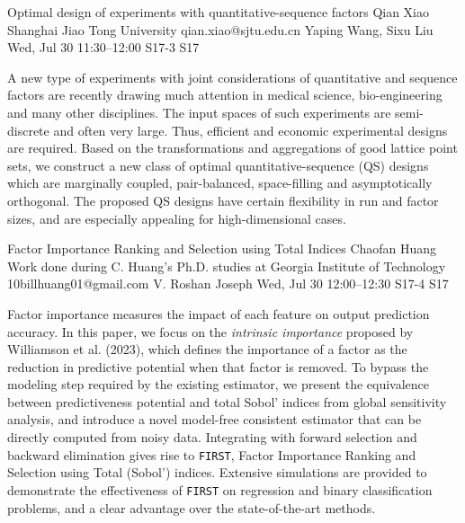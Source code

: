 \documentclass[12pt,lettersize,oneside]{book} %
\begin{document}
\begin{talk}
  {Optimal design of experiments with quantitative-sequence factors}%
  {Qian Xiao}%
  {Shanghai Jiao Tong University}%
  {qian.xiao@sjtu.edu.cn}%
  {Yaping Wang, Sixu Liu}%
  {}%
  {Wed, Jul 30 11:30--12:00}%
  {S17-3}%
  {S17}%
  
    
   
A new type of experiments with joint considerations of quantitative and sequence factors are recently drawing much attention in medical science, bio-engineering and many other disciplines. The input spaces of such experiments are semi-discrete and often very large. Thus, efficient and economic experimental designs are required. Based on the transformations and aggregations of good lattice point sets, we construct a new class of optimal quantitative-sequence (QS) designs which are marginally coupled, pair-balanced, space-filling and asymptotically orthogonal. The proposed QS designs have certain flexibility in run and factor sizes, and are especially appealing for high-dimensional cases.

\end{talk}

\begin{talk}
  {Factor Importance Ranking and Selection using Total Indices}%
  {Chaofan Huang}%
  {Work done during C. Huang's Ph.D. studies at Georgia Institute of Technology}%
  {10billhuang01@gmail.com}%
  {V. Roshan Joseph}%
  {}%
  {Wed, Jul 30 12:00--12:30}%
  {S17-4}%
  {S17}%
  
    
   
Factor importance measures the impact of each feature on output prediction accuracy. In this paper, we focus on the \emph{intrinsic importance} proposed by Williamson et al. (2023), which defines the importance of a factor as the reduction in predictive potential when that factor is removed. To bypass the modeling step required by the existing estimator, we present the equivalence between predictiveness potential and total Sobol' indices from global sensitivity analysis, and introduce a novel model-free consistent estimator that can be directly computed from noisy data. Integrating with forward selection and backward elimination gives rise to \texttt{FIRST}, Factor Importance Ranking and Selection using Total (Sobol') indices. Extensive simulations are provided to demonstrate the effectiveness of \texttt{FIRST} on regression and binary classification problems, and a clear advantage over the state-of-the-art methods.
\end{talk}
\end{document}
